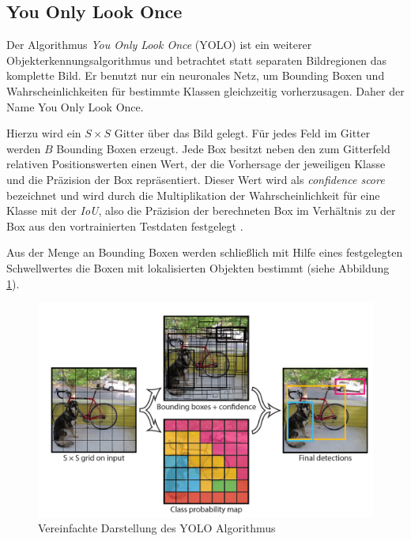 \subsection*{You Only Look Once}

Der Algorithmus \textit{You Only Look Once} (YOLO) ist ein weiterer Objekterkennungsalgorithmus und betrachtet statt separaten Bildregionen das komplette Bild. Er benutzt nur ein neuronales Netz, um Bounding Boxen und Wahrscheinlichkeiten für bestimmte Klassen gleichzeitig vorherzusagen. Daher der Name \glqq You Only Look Once\grqq{}.

Hierzu wird ein $S \times S$ Gitter über das Bild gelegt. Für jedes Feld im Gitter werden $B$ Bounding Boxen erzeugt. Jede Box besitzt neben den zum Gitterfeld relativen Positionswerten einen Wert, der die Vorhersage der jeweiligen Klasse und die Präzision der Box repräsentiert. Dieser Wert wird als \textit{confidence score} bezeichnet und wird durch die Multiplikation der Wahrscheinlichkeit für eine Klasse mit der \textit{IoU}, also die Präzision der berechneten Box im Verhältnis zu der Box aus den vortrainierten Testdaten festgelegt \cite{JosephRedmon.2016}.

Aus der Menge an Bounding Boxen werden schließlich mit Hilfe eines festgelegten Schwellwertes die Boxen mit lokalisierten Objekten bestimmt (siehe Abbildung \ref{yolo_model}).

\begin{figure}[ht]
	\begin{center}
		\includegraphics[width=15cm]{Bilder/yolo_model.png} 
		\caption[Vereinfachte Darstellung des YOLO Algorithmus]{Vereinfachte Darstellung des YOLO Algorithmus \cite{JosephRedmon.2016}}
		\label{yolo_model}
	\end{center}
\end{figure}

